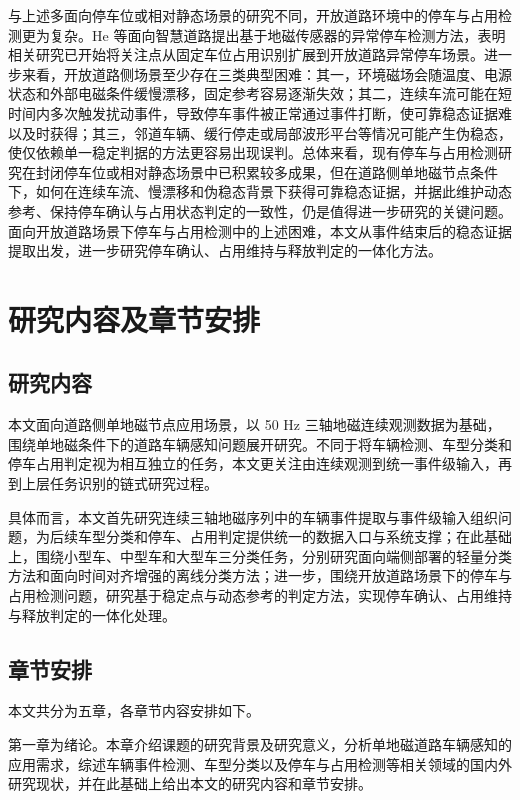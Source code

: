 \documentclass{xdupgthesis}
\begin{document}
与上述多面向停车位或相对静态场景的研究不同，开放道路环境中的停车与占用检测更为复杂。He 等\cite{R43}面向智慧道路提出基于地磁传感器的异常停车检测方法，表明相关研究已开始将关注点从固定车位占用识别扩展到开放道路异常停车场景。进一步来看，开放道路侧场景至少存在三类典型困难：其一，环境磁场会随温度、电源状态和外部电磁条件缓慢漂移，固定参考容易逐渐失效；其二，连续车流可能在短时间内多次触发扰动事件，导致停车事件被正常通过事件打断，使可靠稳态证据难以及时获得；其三，邻道车辆、缓行停走或局部波形平台等情况可能产生伪稳态，使仅依赖单一稳定判据的方法更容易出现误判。总体来看，现有停车与占用检测研究在封闭停车位或相对静态场景中已积累较多成果，但在道路侧单地磁节点条件下，如何在连续车流、慢漂移和伪稳态背景下获得可靠稳态证据，并据此维护动态参考、保持停车确认与占用状态判定的一致性，仍是值得进一步研究的关键问题。面向开放道路场景下停车与占用检测中的上述困难，本文从事件结束后的稳态证据提取出发，进一步研究停车确认、占用维持与释放判定的一体化方法。


\section{研究内容及章节安排}
\label{sec:intro_content}

\subsection{研究内容}
\label{sec:research_content}

本文面向道路侧单地磁节点应用场景，以 50 Hz 三轴地磁连续观测数据为基础，围绕单地磁条件下的道路车辆感知问题展开研究。不同于将车辆检测、车型分类和停车占用判定视为相互独立的任务，本文更关注由连续观测到统一事件级输入，再到上层任务识别的链式研究过程。

具体而言，本文首先研究连续三轴地磁序列中的车辆事件提取与事件级输入组织问题，为后续车型分类和停车、占用判定提供统一的数据入口与系统支撑；在此基础上，围绕小型车、中型车和大型车三分类任务，分别研究面向端侧部署的轻量分类方法和面向时间对齐增强的离线分类方法；进一步，围绕开放道路场景下的停车与占用检测问题，研究基于稳定点与动态参考的判定方法，实现停车确认、占用维持与释放判定的一体化处理。

\subsection{章节安排}
\label{sec:thesis_organization}

本文共分为五章，各章节内容安排如下。

第一章为绪论。本章介绍课题的研究背景及研究意义，分析单地磁道路车辆感知的应用需求，综述车辆事件检测、车型分类以及停车与占用检测等相关领域的国内外研究现状，并在此基础上给出本文的研究内容和章节安排。
\end{document}

